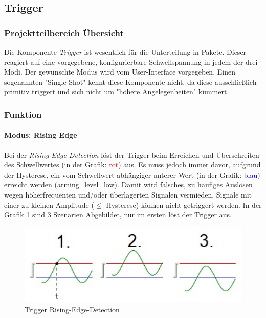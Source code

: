 \subsection{Trigger}\label{trigger}
\subsubsection{Projektteilbereich Übersicht}
Die Komponente \textit{Trigger} ist wesentlich für die Unterteilung in Pakete. Dieser reagiert auf eine vorgegebene, konfigurierbare Schwellspannung in jedem der drei Modi. Der gewünschte Modus wird vom User-Interface vorgegeben. Einen sogenannten "Single-Shot" kennt diese Komponente nicht, da diese ausschließlich primitiv triggert und sich nicht um "höhere Angelegenheiten" kümmert.
\subsubsection{Funktion}
\paragraph{Modus: Rising Edge}
Bei der \textit{Rising-Edge-Detection} löst der Trigger beim Erreichen und Überschreiten des Schwellwertes (in der Grafik: \textcolor{red}{rot}) aus. Es muss jedoch immer davor, aufgrund der Hysterese, ein vom Schwellwert abhängiger unterer Wert (in der Grafik: \textcolor{blue}{blau}) erreicht werden (arming\_level\_low). Damit wird falsches, zu häufiges Auslösen wegen höherfrequenten und/oder überlagerten Signalen vermieden. Signale mit einer zu kleinen Amplitude ($\leq$ Hysterese) können nicht getriggert werden. In der Grafik \ref{risingEdge} sind 3 Szenarien Abgebildet, nur im ersten löst der Trigger aus.
\begin{figure}[h]
	\begin{center}
		\includegraphics[width=15cm]{SAUER/Grafiken/Trigger/TriggerEdgeRising.jpg}
		\caption{Trigger Rising-Edge-Detection}
		\label{risingEdge}
	\end{center}
\end{figure}
